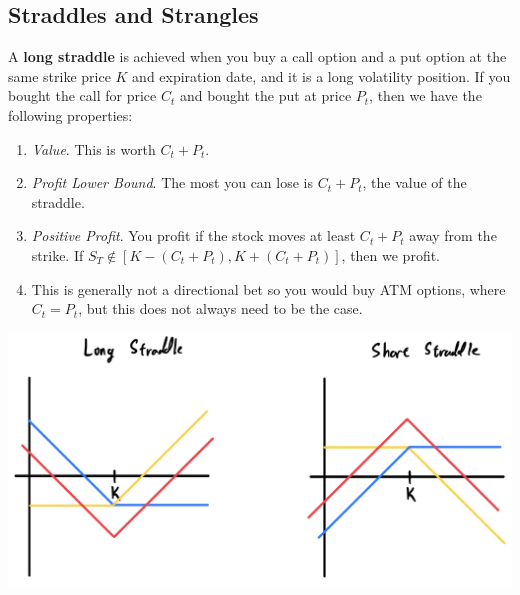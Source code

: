\documentclass{article}
\begin{document}
  \subsection{Straddles and Strangles}

    \begin{definition}[Straddles, Y]
      A \textbf{long straddle} is achieved when you buy a call option and a put option at the same strike price $K$ and expiration date, and it is a long volatility position. If you bought the call for price $C_t$ and bought the put at price $P_t$, then we have the following properties: 
      \begin{enumerate}
        \item \textit{Value}. This is worth $C_t + P_t$. 
        \item \textit{Profit Lower Bound}. The most you can lose is $C_t + P_t$, the value of the straddle.  
        \item \textit{Positive Profit}. You profit if the stock moves at least $C_t + P_t$ away from the strike. If $S_T \not\in [K - (C_t + P_t), K + (C_t + P_t)]$, then we profit. 
        \item This is generally not a directional bet so you would buy ATM options, where $C_t = P_t$, but this does not always need to be the case. 
      \end{enumerate}
      \begin{center}
        \includegraphics[scale=0.3]{img/straddle.png}
      \end{center}
    \end{definition}
\end{document}
